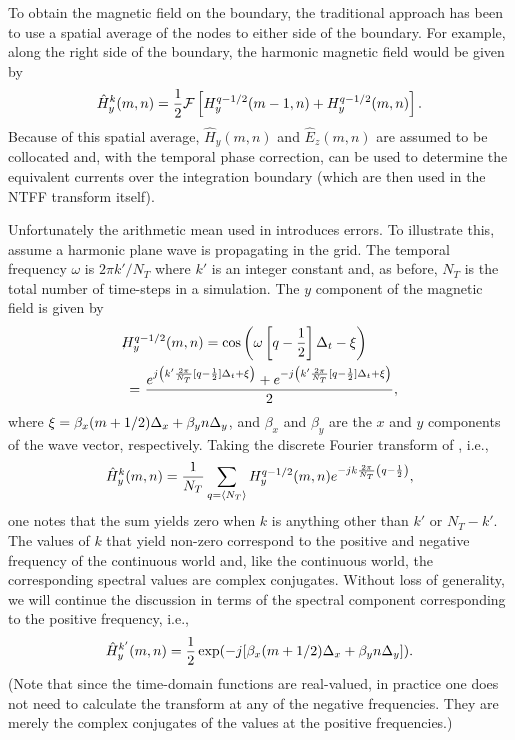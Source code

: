 To obtain the magnetic field on the boundary, the traditional approach
has been to use a spatial average of the nodes to either side of the
boundary.  For example, along the right side of the boundary, the
harmonic magnetic field would be given by
\begin{equation}
  \hat{H}^k_y(m,n) = 
  \frac{1}{2}{\cal F}\left[H_y^{q-1/2}(m-1,n)+H_y^{q-1/2}(m,n)\right].
  \label{eq:arithmetic}
\end{equation}
Because of this spatial average, $\hat{H}_y(m,n)$ and $\hat{E}_z(m,n)$
are assumed to be collocated and, with the temporal phase correction,
can be used to determine the equivalent currents over the integration
boundary (which are then used in the NTFF transform itself).

Unfortunately the arithmetic mean used in 
introduces errors.  To illustrate this, assume a harmonic plane wave
is propagating in the grid.  The temporal frequency $\omega$ is $2\pi
k'/N_T$ where $k'$ is an integer constant and, as before, $N_T$ is the
total number of time-steps in a simulation.  The $y$ component of the
magnetic field is given by
\begin{eqnarray}
   \lefteqn{H_y^{q-1/2}(m,n) =
     \cos\left(\omega\left[q-\half\right]\Delt-\xi\right)}, \\
   &=&\!\!\!\!
      \frac{e^{j\left(k'\frac{2\pi}{N_T}[q-\half]\Delt+\xi\right)}+
            e^{-j\left(k'\frac{2\pi}{N_T}[q-\half]\Delt+\xi\right)}}{2},
   \label{eq:hyPlaneWave}
\end{eqnarray}
where $\xi=\beta_x(m+1/2)\Delta_x + \beta_y n\Delta_y$, and $\beta_x$ and
$\beta_y$ are the $x$ and $y$ components of the wave vector,
respectively.  Taking the discrete Fourier transform of
, i.e.,
\begin{equation}
  \hat{H}^k_y(m,n)
    = \frac{1}{N_T}
        \sum_{q=\langle N_T\rangle} H_y^{q-1/2}(m,n) 
             e^{-jk\frac{2\pi}{N_T}\left(q-\frac{1}{2}\right)},
\end{equation}
one notes that the sum yields zero when $k$ is anything other than
$k'$ or $N_T-k'$.  The values of $k$ that yield non-zero correspond
to the positive and negative frequency of the continuous world and,
like the continuous world, the corresponding spectral values are
complex conjugates.  Without loss of generality, we will continue the
discussion in terms of the spectral component corresponding to the
positive frequency, i.e., 
\begin{equation}
  \hat{H}^{k'}_y(m,n) =
    \frac{1}{2} \exp(-j[\beta_x(m+1/2)\Delta_x + \beta_y n\Delta_y]).
\end{equation}
(Note that since the time-domain functions are real-valued, in
practice one does not need to calculate the transform at any of the
negative frequencies.  They are merely the complex conjugates of the
values at the positive frequencies.)

